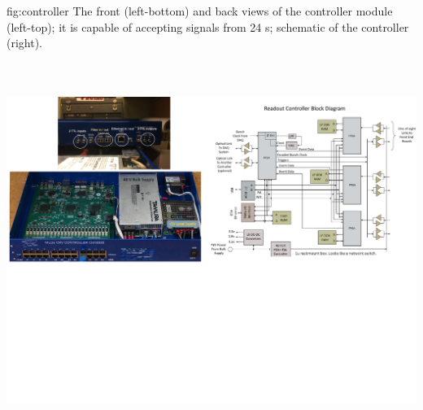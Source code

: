 \begin{dunefigure}
 {fig:controller}
 {The front (left-bottom) and back views of the controller module (left-top); it is capable of accepting signals from 24 s; schematic of the controller (right).}
\includegraphics[height=5.1in]{graphics/pds-controller.pdf} 
\vspace{-5.5cm}
\end{dunefigure}

